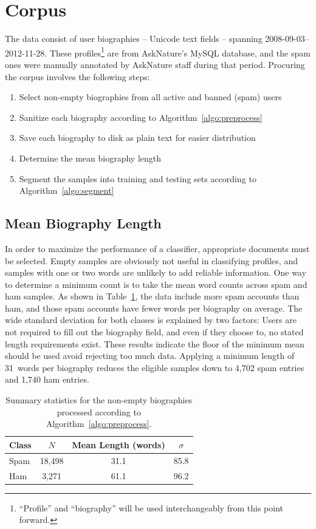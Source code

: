 \documentclass[10pt]{article}
\def \minWordLength {31\ }
\begin{document}
\section{Corpus}
The data consist of user biographies -- Unicode text fields -- spanning
2008-09-03--2012-11-28. These profiles\footnote{``Profile'' and ``biography''
  will be used interchangeably from this point forward.} are from AskNature's
MySQL database, and the spam ones were manually annotated by AskNature staff
during that period. Procuring the corpus involves the following steps:

\begin{enumerate}
\item Select non-empty biographies from all active and banned (spam) users
\item Sanitize each biography according to Algorithm~\ref{algo:preprocess}
\item Save each biography to disk as plain text for easier distribution
\item Determine the mean biography length
\item Segment the samples into training and testing sets according to
  Algorithm~\ref{algo:segment}
\end{enumerate}

\subsection{Mean Biography Length}
In order to maximize the performance of a classifier, appropriate documents
must be selected. Empty samples are obviously not useful in classifying
profiles, and samples with one or two words are unlikely to add reliable
information. One way to determine a minimum count is to take the mean word
counts across spam and ham samples. As shown in
Table~\ref{table:corpus-stats}, the data include more spam accounts than ham,
and those spam accounts have fewer words per biography on average. The wide
standard deviation for both classes is explained by two factors: Users are not
required to fill out the biography field, and even if they choose to, no
stated length requirements exist. These results indicate the floor of the
minimum mean should be used avoid rejecting too much data. Applying a minimum
length of \minWordLength words per biography reduces the eligible samples down
to 4,702 spam entries and 1,740 ham entries.

\begin{table}[t]
  \centering
  \caption{Summary statistics for the non-empty biographies processed
    according to Algorithm~\ref{algo:preprocess}.}
  \label{table:corpus-stats}
  \begin{tabular}{lccc}
    \toprule
    Class & $N$ & Mean Length (words) & $\sigma$\\ \midrule
    Spam  & 18,498 & 31.1 & 85.8 \\
    Ham   & 3,271  & 61.1 & 96.2 \\
    \bottomrule
  \end{tabular}
\end{table}
\end{document}
